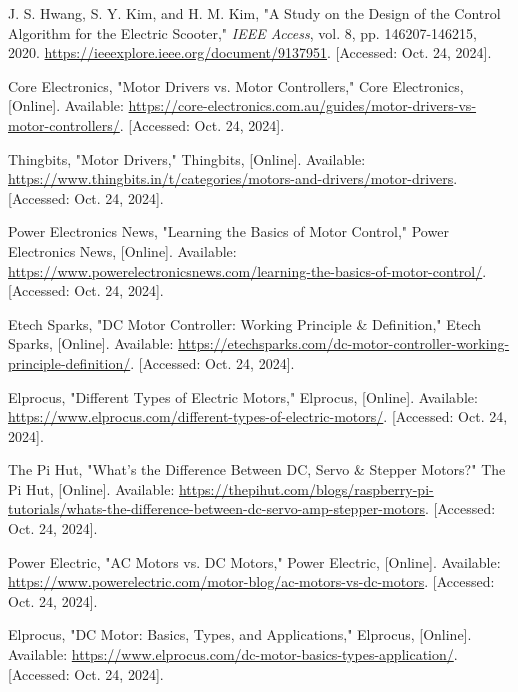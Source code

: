 \begin{thebibliography}{45}
	 J. S. Hwang, S. Y. Kim, and H. M. Kim, "A Study on the Design of the Control Algorithm for the Electric Scooter," \textit{IEEE Access}, vol. 8, pp. 146207-146215, 2020. \href{https://ieeexplore.ieee.org/document/9137951}{https://ieeexplore.ieee.org/document/9137951}. [Accessed: Oct. 24, 2024].

	 Core Electronics, "Motor Drivers vs. Motor Controllers," Core Electronics, [Online]. Available: \href{https://core-electronics.com.au/guides/motor-drivers-vs-motor-controllers/}{https://core-electronics.com.au/guides/motor-drivers-vs-motor-controllers/}. [Accessed: Oct. 24, 2024].
	
	 Thingbits, "Motor Drivers," Thingbits, [Online]. Available: \href{https://www.thingbits.in/t/categories/motors-and-drivers/motor-drivers}{https://www.thingbits.in/t/categories/motors-and-drivers/motor-drivers}. [Accessed: Oct. 24, 2024].
	
	 Power Electronics News, "Learning the Basics of Motor Control," Power Electronics News, [Online]. Available: \href{https://www.powerelectronicsnews.com/learning-the-basics-of-motor-control/}{https://www.powerelectronicsnews.com/learning-the-basics-of-motor-control/}. [Accessed: Oct. 24, 2024].
	
	 Etech Sparks, "DC Motor Controller: Working Principle \& Definition," Etech Sparks, [Online]. Available: \href{https://etechsparks.com/dc-motor-controller-working-principle-definition/}{https://etechsparks.com/dc-motor-controller-working-principle-definition/}. [Accessed: Oct. 24, 2024].
	
	 Elprocus, "Different Types of Electric Motors," Elprocus, [Online]. Available: \url{https://www.elprocus.com/different-types-of-electric-motors/}. [Accessed: Oct. 24, 2024]. 
	
	 The Pi Hut, "What's the Difference Between DC, Servo \& Stepper Motors?" The Pi Hut, [Online]. Available: \url{https://thepihut.com/blogs/raspberry-pi-tutorials/whats-the-difference-between-dc-servo-amp-stepper-motors}. [Accessed: Oct. 24, 2024]. 
	
	 Power Electric, "AC Motors vs. DC Motors," Power Electric, [Online]. Available: \url{https://www.powerelectric.com/motor-blog/ac-motors-vs-dc-motors}. [Accessed: Oct. 24, 2024]. 
	
	 Elprocus, "DC Motor: Basics, Types, and Applications," Elprocus, [Online]. Available: \url{https://www.elprocus.com/dc-motor-basics-types-application/}. [Accessed: Oct. 24, 2024]. 
	

\end{thebibliography}
